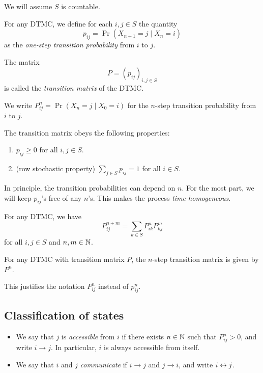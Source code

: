 We will assume $S$ is countable.
\begin{definition} \label{def:dtmc:trans}
    For any DTMC, we define for each $i, j \in S$ the quantity \[
        p_{ij} = \Pr(X_{n+1} = j \mid X_n = i)
    \] as the \emph{one-step transition probability} from $i$ to $j$.

    The matrix \[
        P = (p_{ij})_{i, j \in S}
    \] is called the \emph{transition matrix} of the DTMC.

    We write $P_{ij}^n = \Pr(X_n = j \mid X_0 = i)$ for the $n$-step
    transition probability from $i$ to $j$.
\end{definition}
The transition matrix obeys the following properties:
\begin{enumerate}
    \item $p_{ij} \geq 0$ for all $i, j \in S$.
    \item (row stochastic property)
        $\sum_{j \in S} p_{ij} = 1$ for all $i \in S$.
\end{enumerate}

\begin{remark}
    In principle, the transition probabilities can depend on $n$.
    For the most part, we will keep $p_{ij}$'s free of any $n$'s.
    This makes the process \emph{time-homogeneous}.
\end{remark}

\begin{theorem*} \label{thm:chapman-kolmogorov}
    For any DTMC, we have \[
        P_{ij}^{n+m} = \sum_{k \in S} P_{ik}^n P_{kj}^m
    \] for all $i, j \in S$ and $n, m \in \mathbb{N}$.
\end{theorem*}
\begin{corollary}
    For any DTMC with transition matrix $P$, the $n$-step transition matrix
    is given by $P^n$.
\end{corollary}
This justifies the notation $P_{ij}^n$ instead of $p_{ij}^n$.

\subsection{Classification of states} \label{sec:dtmc:states}
\begin{definition*} \leavevmode
    \begin{itemize}
        \item We say that $j$ is \emph{accessible} from $i$ if there exists
            $n \in \mathbb{N}$ such that $P_{ij}^n > 0$, and write $i \to j$.
            In particular, $i$ is always accessible from itself.
        \item We say that $i$ and $j$ \emph{communicate}
            if $i \to j$ and $j \to i$,
            and write $i \leftrightarrow j$.
    \end{itemize}
\end{definition*}

